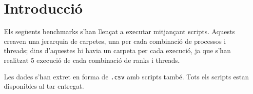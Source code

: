 \section{Introducció}
Els següents benchmarks s'han llençat a executar mitjançant scripts. Aquests creaven una jerarquia de carpetes, una per cada combinació de processos i threads; dins d'aquestes hi havia un carpeta per cada execució, ja que s'han realitzat 5 execució de cada combinació de ranks i threads.

Les dades s'han extret en forma de \texttt{.csv} amb scripts també. Tots els scripts estan disponibles al tar entregat.

